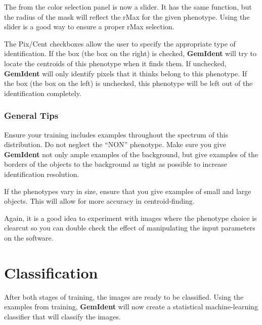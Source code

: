 \documentclass[12pt]{article}
\begin{document}
The  from the {\sf color selection} panel is now a  slider. It has the same function, but the radius of the mask will reflect the {\sf rMax} for the given phenotype. Using the slider is a good way to ensure a proper {\sf rMax} selection.

The {\sf Pix/Cent} checkboxes allow the user to specify the appropriate type of identification. If the  box (the box on the right) is checked, {\bf GemIdent} will try to locate the centroids of this phenotype when it finds them. If unchecked, {\bf GemIdent} will only identify pixels that it thinks belong to this phenotype. If the  box (the box on the left) is unchecked, this phenotype will be left out of the identification completely.

\subsubsection{General Tips}

Ensure your training includes examples throughout the spectrum of this distribution. Do not neglect the ``NON'' phenotype. Make sure you give {\bf GemIdent} not only ample examples of the background, but give examples of the borders of the objects to the background as tight as possible to increase identification resolution.

If the phenotypes vary in size, ensure that you give examples of small and large objects. This will allow for more accuracy in centroid-finding. 

Again, it is a good idea to experiment with images where the phenotype choice is clearcut
so you can double check the effect of manipulating the input parameters on the software.

\section{Classification}

After both stages of training, the images are ready to be classified. Using the examples from training, {\bf GemIdent} will now create a statistical machine-learning classifier that will classify the images. 
\end{document}
